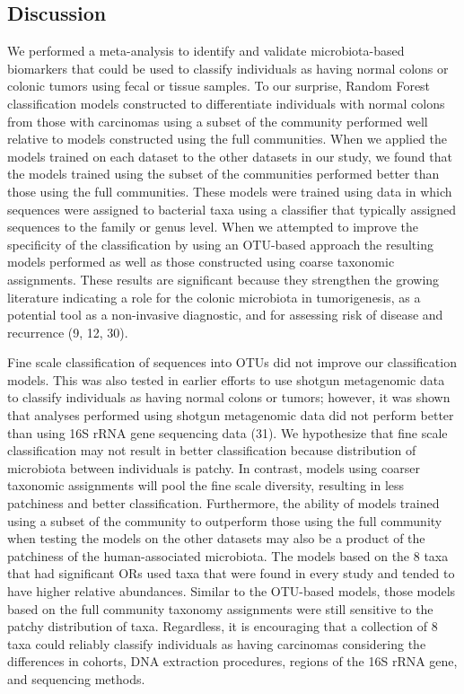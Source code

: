 \documentclass[12pt,]{article}
\begin{document}
\newpage

\subsection{Discussion}\label{discussion}

We performed a meta-analysis to identify and validate microbiota-based
biomarkers that could be used to classify individuals as having normal
colons or colonic tumors using fecal or tissue samples. To our surprise,
Random Forest classification models constructed to differentiate
individuals with normal colons from those with carcinomas using a subset
of the community performed well relative to models constructed using the
full communities. When we applied the models trained on each dataset to
the other datasets in our study, we found that the models trained using
the subset of the communities performed better than those using the full
communities. These models were trained using data in which sequences
were assigned to bacterial taxa using a classifier that typically
assigned sequences to the family or genus level. When we attempted to
improve the specificity of the classification by using an OTU-based
approach the resulting models performed as well as those constructed
using coarse taxonomic assignments. These results are significant
because they strengthen the growing literature indicating a role for the
colonic microbiota in tumorigenesis, as a potential tool as a
non-invasive diagnostic, and for assessing risk of disease and
recurrence (9, 12, 30).

Fine scale classification of sequences into OTUs did not improve our
classification models. This was also tested in earlier efforts to use
shotgun metagenomic data to classify individuals as having normal colons
or tumors; however, it was shown that analyses performed using shotgun
metagenomic data did not perform better than using 16S rRNA gene
sequencing data (31). We hypothesize that fine scale classification may
not result in better classification because distribution of microbiota
between individuals is patchy. In contrast, models using coarser
taxonomic assignments will pool the fine scale diversity, resulting in
less patchiness and better classification. Furthermore, the ability of
models trained using a subset of the community to outperform those using
the full community when testing the models on the other datasets may
also be a product of the patchiness of the human-associated microbiota.
The models based on the 8 taxa that had significant ORs used taxa that
were found in every study and tended to have higher relative abundances.
Similar to the OTU-based models, those models based on the full
community taxonomy assignments were still sensitive to the patchy
distribution of taxa. Regardless, it is encouraging that a collection of
8 taxa could reliably classify individuals as having carcinomas
considering the differences in cohorts, DNA extraction procedures,
regions of the 16S rRNA gene, and sequencing methods.
\end{document}
